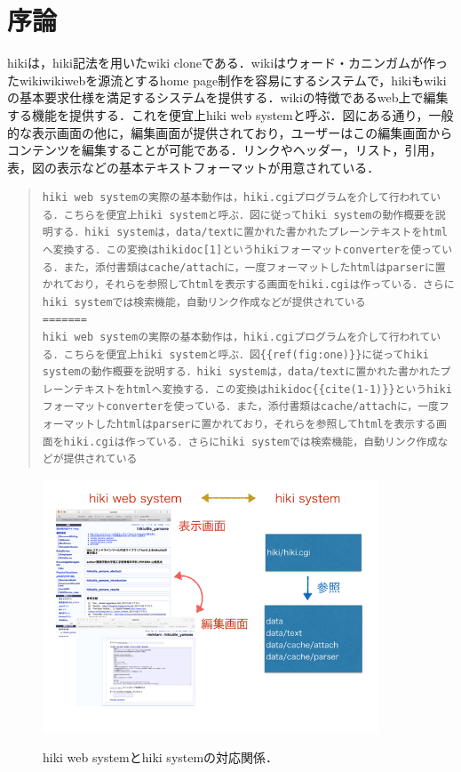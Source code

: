 \section{序論}
hikiは，hiki記法を用いたwiki cloneである．wikiはウォード・カニンガムが作ったwikiwikiwebを源流とするhome page制作を容易にするシステムで，hikiもwikiの基本要求仕様を満足するシステムを提供する．wikiの特徴であるweb上で編集する機能を提供する．これを便宜上hiki web systemと呼ぶ．図にある通り，一般的な表示画面の他に，編集画面が提供されており，ユーザーはこの編集画面からコンテンツを編集することが可能である．リンクやヘッダー，リスト，引用，表，図の表示などの基本テキストフォーマットが用意されている．
\begin{quote}\begin{verbatim}
hiki web systemの実際の基本動作は，hiki.cgiプログラムを介して行われている．こちらを便宜上hiki systemと呼ぶ．図に従ってhiki systemの動作概要を説明する．hiki systemは，data/textに置かれた書かれたプレーンテキストをhtmlへ変換する．この変換はhikidoc[1]というhikiフォーマットconverterを使っている．また，添付書類はcache/attachに，一度フォーマットしたhtmlはparserに置かれており，それらを参照してhtmlを表示する画面をhiki.cgiは作っている．さらにhiki systemでは検索機能，自動リンク作成などが提供されている
=======
hiki web systemの実際の基本動作は，hiki.cgiプログラムを介して行われている．こちらを便宜上hiki systemと呼ぶ．図{{ref(fig:one)}}に従ってhiki systemの動作概要を説明する．hiki systemは，data/textに置かれた書かれたプレーンテキストをhtmlへ変換する．この変換はhikidoc{{cite(1-1)}}というhikiフォーマットconverterを使っている．また，添付書類はcache/attachに，一度フォーマットしたhtmlはparserに置かれており，それらを参照してhtmlを表示する画面をhiki.cgiは作っている．さらにhiki systemでは検索機能，自動リンク作成などが提供されている
\end{verbatim}\end{quote}
\begin{figure}[htbp]\begin{center}
\includegraphics[width=10cm,bb= 0 0 737 553]{../figs/./hikiutils_yamane.001.jpg}
\caption{hiki web systemとhiki systemの対応関係．}
\label{fig:one}
\label{default}\end{center}\end{figure}
